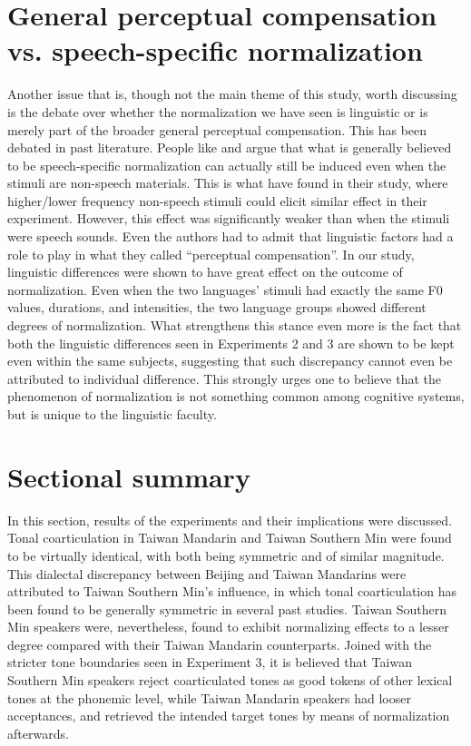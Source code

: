 \documentclass[12pt]{report}
\begin{document}
\begin{CJK}{UTF8}{bsmi}
\section{General perceptual compensation vs. speech-specific normalization}\label{section:General perceptual compensation vs. speech-specific normalization}

Another issue that is, though not the main theme of this study, worth discussing is the debate over whether the normalization we have seen is linguistic or is merely part of the broader general perceptual compensation. This has been debated in past literature. People like \cite{WatkinsMakin1994} and \cite{Zhangetal2022} argue that what is generally believed to be speech-specific normalization can actually still be induced even when the stimuli are non-speech materials. This is what \citeauthor{Zhangetal2022} have found in their study, where higher/lower frequency non-speech stimuli could elicit similar effect in their experiment. However, this effect was significantly weaker than when the stimuli were speech sounds. Even the authors had to admit that linguistic factors had a role to play in what they called ``perceptual compensation''. In our study, linguistic differences were shown to have great effect on the outcome of normalization. Even when the two languages' stimuli had exactly the same F0 values, durations, and intensities, the two language groups showed different degrees of normalization. What strengthens this stance even more is the fact that both the linguistic differences seen in Experiments 2 and 3 are shown to be kept even within the same subjects, suggesting that such discrepancy cannot even be attributed to individual difference. This strongly urges one to believe that the phenomenon of normalization is not something common among cognitive systems, but is unique to the linguistic faculty.

\section{Sectional summary}
In this section, results of the experiments and their implications were discussed. Tonal coarticulation in Taiwan Mandarin and Taiwan Southern Min were found to be virtually identical, with both being symmetric and of similar magnitude. This dialectal discrepancy between Beijing and Taiwan Mandarins were attributed to Taiwan Southern Min's influence, in which tonal coarticulation has been found to be generally symmetric in several past studies. Taiwan Southern Min speakers were, nevertheless, found to exhibit normalizing effects to a lesser degree compared with their Taiwan Mandarin counterparts. Joined with the stricter tone boundaries seen in Experiment 3, it is believed that Taiwan Southern Min speakers reject coarticulated tones as good tokens of other lexical tones at the phonemic level, while Taiwan Mandarin speakers had looser acceptances, and retrieved the intended target tones by means of normalization afterwards.


\end{CJK}
\end{document}
